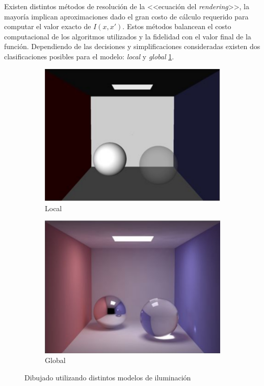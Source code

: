 Existen distintos métodos de resolución de la <<ecuación del \textit{rendering}>>, la mayoría implican aproximaciones dado el gran costo de cálculo requerido para computar el valor exacto de $I(x,x')$. Estos métodos balancean el costo computacional de los algoritmos utilizados y la fidelidad con el valor final de la función. Dependiendo de las decisiones y simplificaciones consideradas existen dos clasificaciones posibles para el modelo: \textit{local} y \textit{global} \ref{local-vs-global-img}.

\vspace{5mm}
\begin{figure}[h]
	\begin{subfigure}{0.5\textwidth}
		  	\centering
   		 	\includegraphics[width=1\linewidth]{assets/local}
   		 	\caption{Local}
   	\end{subfigure}
    \begin{subfigure}{0.5\textwidth}
    	\centering
    	\includegraphics[width=1\linewidth]{assets/global}
    	\caption{Global}
    \end{subfigure}
    \caption{Dibujado utilizando distintos modelos de iluminación}
    \label{local-vs-global-img}
\end{figure}

